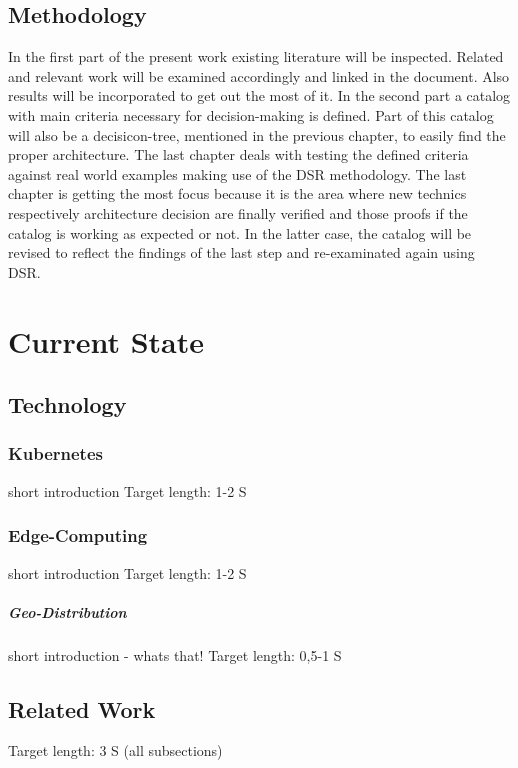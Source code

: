 \documentclass[MSC,Master,english]{twbook}%
\begin{document}
\section{Methodology}
\label{sec:methodology}
In the first part of the present work existing literature will be inspected. Related and relevant work will be examined accordingly and linked in the document. Also results will be incorporated to get out the most of it. In the second part a catalog with main criteria necessary for decision-making is defined. Part of this catalog will also be a decisicon-tree, mentioned in the previous chapter, to easily find the proper architecture. The last chapter deals with testing the defined criteria against real world examples making use of the \ac{DSR} methodology. The last chapter is getting the most focus because it is the area where new technics respectively architecture decision are finally verified and those proofs if the catalog is working as expected or not. In the latter case, the catalog will be revised to reflect the findings of the last step and re-examinated again using \ac{DSR}.




\chapter{Current State}
\label{chap:current}

\section{Technology}
\label{sec:technology}
\subsection{Kubernetes}
short introduction
Target length: 1-2 S
\subsection{Edge-Computing}
short introduction
Target length: 1-2 S
\paragraph{Geo-Distribution}
short introduction - whats that!
Target length: 0,5-1 S


\section{Related Work}
\label{sec:related}
Target length: 3 S (all subsections)
\end{document}
